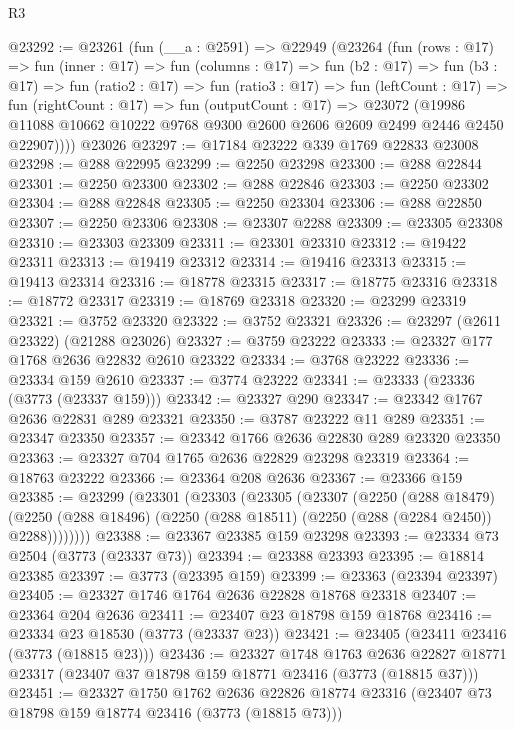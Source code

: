 \begin{lexlean}{R3}
\begin{coremodule}
@23292 := @23261
    (fun (__a : @2591) =>
    @22949
      (@23264
        (fun (rows : @17) =>
        fun (inner : @17) =>
        fun (columns : @17) =>
        fun (b2 : @17) =>
        fun (b3 : @17) =>
        fun (ratio2 : @17) =>
        fun (ratio3 : @17) =>
        fun (leftCount : @17) =>
        fun (rightCount : @17) =>
        fun (outputCount : @17) =>
        @23072
          (@19986 @11088 @10662 @10222 @9768 @9300 @2600 @2606 @2609 @2499 @2446 @2450 @22907))))
    @23026
@23297 := @17184 @23222 @339 @1769 @22833 @23008
@23298 := @288 @22995
@23299 := @2250 @23298
@23300 := @288 @22844
@23301 := @2250 @23300
@23302 := @288 @22846
@23303 := @2250 @23302
@23304 := @288 @22848
@23305 := @2250 @23304
@23306 := @288 @22850
@23307 := @2250 @23306
@23308 := @23307 @2288
@23309 := @23305 @23308
@23310 := @23303 @23309
@23311 := @23301 @23310
@23312 := @19422 @23311
@23313 := @19419 @23312
@23314 := @19416 @23313
@23315 := @19413 @23314
@23316 := @18778 @23315
@23317 := @18775 @23316
@23318 := @18772 @23317
@23319 := @18769 @23318
@23320 := @23299 @23319
@23321 := @3752 @23320
@23322 := @3752 @23321
@23326 := @23297 (@2611 @23322) (@21288 @23026)
@23327 := @3759 @23222
@23333 := @23327 @177 @1768 @2636 @22832 @2610 @23322
@23334 := @3768 @23222
@23336 := @23334 @159 @2610
@23337 := @3774 @23222
@23341 := @23333 (@23336 (@3773 (@23337 @159)))
@23342 := @23327 @290
@23347 := @23342 @1767 @2636 @22831 @289 @23321
@23350 := @3787 @23222 @11 @289
@23351 := @23347 @23350
@23357 := @23342 @1766 @2636 @22830 @289 @23320 @23350
@23363 := @23327 @704 @1765 @2636 @22829 @23298 @23319
@23364 := @18763 @23222
@23366 := @23364 @208 @2636
@23367 := @23366 @159
@23385 := @23299
    (@23301
      (@23303
        (@23305
          (@23307
            (@2250
              (@288 @18479)
              (@2250 (@288 @18496) (@2250 (@288 @18511) (@2250 (@288 (@2284 @2450)) @2288))))))))
@23388 := @23367 @23385 @159 @23298
@23393 := @23334 @73 @2504 (@3773 (@23337 @73))
@23394 := @23388 @23393
@23395 := @18814 @23385
@23397 := @3773 (@23395 @159)
@23399 := @23363 (@23394 @23397)
@23405 := @23327 @1746 @1764 @2636 @22828 @18768 @23318
@23407 := @23364 @204 @2636
@23411 := @23407 @23 @18798 @159 @18768
@23416 := @23334 @23 @18530 (@3773 (@23337 @23))
@23421 := @23405 (@23411 @23416 (@3773 (@18815 @23)))
@23436 := @23327
    @1748
    @1763
    @2636
    @22827
    @18771
    @23317
    (@23407 @37 @18798 @159 @18771 @23416 (@3773 (@18815 @37)))
@23451 := @23327
    @1750
    @1762
    @2636
    @22826
    @18774
    @23316
    (@23407 @73 @18798 @159 @18774 @23416 (@3773 (@18815 @73)))

\end{coremodule}
\end{lexlean}
